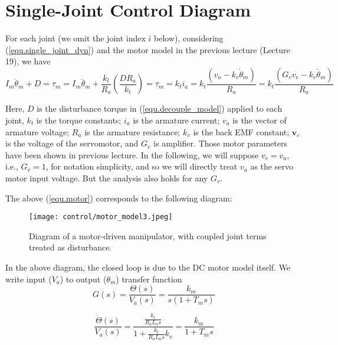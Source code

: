 \documentclass[10pt]{article}
\begin{document}
\section{Single-Joint Control Diagram}

For each joint (we omit the joint index $i$ below), considering (\ref{equ.single_joint_dyn}) and the motor model in the previous lecture (Lecture 19), we have 
\begin{equation}\label{equ.motor}
I_m\ddot{\theta}_m+D=\tau_m=I_m\ddot{\theta}_m+\frac{k_t}{R_a}(\frac{DR_a}{k_t})=\tau_m=k_ti_a=k_t\frac{(v_a-k_v\dot{\theta}_m)}{R_a}=k_t\frac{(G_vv_c-k_v\dot{\theta}_m)}{R_a}
\end{equation}

Here, $D$ is the disturbance torque in (\ref{equ.decouple_model}) applied to each joint,  ${k}_{t}$ is the torque constants;  ${i}_{a}$ is the  armature current; $ {v}_{a}$ is the vector of armature voltage; ${R}_{a}$ is the  armature resistance; ${k}_{v}$ is the back EMF constant; $\boldsymbol{v}_{c}$ is the voltage of the servomotor, and $G_v$ is amplifier. Those motor parameters have been shown in previous lecture. In the following, we will suppose $v_c=v_a$, i.e., $G_v=1$, for notation simplicity, and so we will directly treat $v_a$ as the servo motor input voltage. But the analysis also holds for any $G_v$. 


The above (\ref{equ.motor}) corresponds to the following diagram:
\begin{figure}[H]
    \centering
    \texttt{[image: control/motor\_model3.jpeg]}
    \caption{Diagram of a motor-driven manipulator, with coupled joint terms treated as disturbance.}
    \label{fig:motor_model2}
\end{figure}


In the above diagram, the closed loop is due to the DC motor model itself. We write input ($V_a$) to output ($\theta_m$) transfer function
\begin{equation}\label{equ.motortf}
    G(s)=\frac{{\Theta}(s)}{V_a(s)}=\frac{k_m}{s(1+T_ms)}
\end{equation}

\begin{equation}
    \frac{\dot{\Theta}(s)}{V_a(s)}=\frac{\frac{k_t}{R_aI_ms}}{1+\frac{k_t}{R_aI_ms}k_v}=\frac{k_m}{1+T_ms}
\end{equation}

\end{document}
